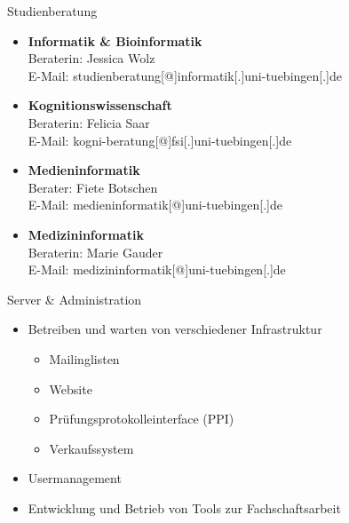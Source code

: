 \documentclass{beamer}
\begin{document}
	\begin{frame}{Studienberatung}
		\begin{itemize}			
			\item \textbf{Informatik \& Bioinformatik}\\			
			Beraterin: Jessica Wolz\\
			E-Mail: studienberatung[@]informatik[.]uni-tuebingen[.]de
			
			\item \textbf{Kognitionswissenschaft}\\	
			Beraterin: Felicia Saar\\
			E-Mail: kogni-beratung[@]fsi[.]uni-tuebingen[.]de
			
			\item \textbf{Medieninformatik}\\
			Berater: Fiete Botschen\\
			E-Mail: medieninformatik[@]uni-tuebingen[.]de\\
			
			\item \textbf{Medizininformatik}\\			
			Beraterin: Marie Gauder\\
			E-Mail: medizininformatik[@]uni-tuebingen[.]de
			
		\end{itemize}
	\end{frame}

	\begin{frame}{Server \& Administration}
		\begin{itemize}			
			\item Betreiben und warten von verschiedener Infrastruktur
			\begin{itemize}
				\item Mailinglisten
				\item Website
				\item Prüfungsprotokolleinterface (PPI)
				\item Verkaufssystem
			\end{itemize}
			\item Usermanagement
			\item Entwicklung und Betrieb von Tools zur Fachschaftsarbeit
		\end{itemize}
	\end{frame}
	
\end{document}
